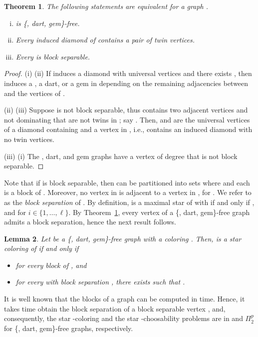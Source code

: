 \documentclass[a4paper, 11pt, oneside]{article}
\newtheorem{theorem}{Theorem}
\newtheorem{lemma}[theorem]{Lemma}
\newcommand{\ptwop}{\ensuremath{\Pi^p_2}\xspace}
\newcommand{\range}[3]{\ensuremath{#1 \in \{#2,\ldots,#3\}}}
\let\Definition=\emph
\begin{document}
\begin{theorem}\label{thm:w4dartgemequivalence}
The following statements are equivalent for a graph .
  \begin{enumerate}[(i)]
    \item  is \{, dart, gem\}-free.
    \item Every induced diamond of  contains a pair of twin vertices.
    \item Every  is block separable. 
  \end{enumerate}
\end{theorem}
\begin{proof} 
 (i)  (ii) If  induces a diamond with universal vertices  and there exists , then  induces a , a dart, or a gem in  depending on the remaining adjacencies between  and the vertices of .

 (ii)  (iii) Suppose  is not block separable, thus  contains two adjacent vertices  and  not dominating  that are not twins in ; say . Then,  and  are the universal vertices of a diamond containing  and a vertex in , i.e.,  contains an induced diamond with no twin vertices.

 (iii)  (i) The , dart, and gem graphs have a vertex of degree  that is not block separable.
\end{proof}


Note that if  is block separable, then  can be partitioned into sets  where  and each  is a block of .  Moreover, no vertex in  is adjacent to a vertex in , for .  We refer to  as the \Definition{block separation} of .  By definition,  is a maximal star of  with  if and only if ,  and  for \range{i}{1}{\ell}.  By Theorem~\ref{thm:w4dartgemequivalence}, every vertex of a \{, dart, gem\}-free graph admits a block separation, hence the next result follows.

\begin{lemma}
 Let  be a \{, dart, gem\}-free graph with a coloring .  Then,  is a star coloring of  if and only if
 \begin{itemize}
  \item  for every block  of , and
  \item for every  with block separation , there exists  such that .
 \end{itemize}
\end{lemma}

It is well known that the blocks of a graph  can be computed in  time.  Hence, it takes  time obtain the block separation of a block separable vertex , and, consequently, the star -coloring and the star -choosability problems are in \NP and \ptwop for \{, dart, gem\}-free graphs, respectively.
\end{document}
